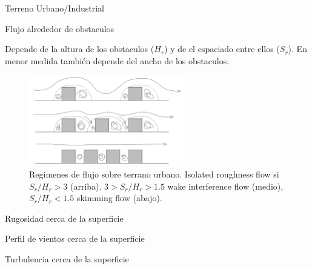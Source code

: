 \subtitle{Terreno urbano e industrial}
 \begin{frame}{}
     \maketitle
 \end{frame}
 
 \begin{frame}{Terreno Urbano/Industrial}
     
     
 \end{frame}
 
 \begin{frame}{Flujo alrededor de obstaculos}
 
 Depende de la altura de los obstaculos ($H_r$) y de el espaciado entre ellos ($S_r$). En menor medida también depende del ancho de los obstaculos.
 
 \begin{figure}
     \centering
     \includegraphics[width=0.6\textwidth]{img/flow_above_obstacles.png}
     \caption{Regimenes de flujo sobre terrano urbano. Isolated roughness flow si $S_r/H_r > 3$ (arriba). $3>S_r/H_r> 1.5$ wake interference flow (medio), $S_r/H_r<1.5$ skimming flow (abajo).}
 \end{figure}
 \end{frame}
 
 \begin{frame}{Rugosidad cerca de la superficie}
     
     
 \end{frame}

 \begin{frame}{Perfil de vientos cerca de la superficie}
     
     
 \end{frame}
 
 \begin{frame}{Turbulencia cerca de la superficie}
     
     
 \end{frame}